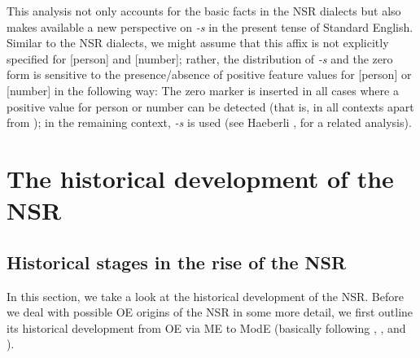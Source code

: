 \documentclass[output=paper]{langsci/langscibook}
\begin{document}
This analysis not only accounts for the basic facts in the
\gls{NSR} dialects but also makes available a new
perspective on \Tsg{} \emph{-s} in the present tense of Standard English.
Similar to the \gls{NSR} dialects, we might assume
that this affix is not explicitly specified for [person] and [number]; rather,
the distribution of \emph{-s} and the zero form is sensitive to the
presence/absence of positive feature values for [person] or [number] in the
following way: The zero marker is inserted in all cases where a positive value
for person or number can be detected (that is, in all contexts apart from
\Tsg{}); in the remaining context, \emph{-s} is used (see Haeberli
\citeyear{Haeberli:2002b}, \citealt{Roberts:2010} for a related analysis).

\section{The historical development of the NSR}
\label{sec:stages}

\subsection{Historical stages in the rise of the NSR}

In this section, we take a look at the historical development of the
\gls{NSR}.  Before we deal with possible \gls{OE}
origins of the \gls{NSR} in some more detail, we
first outline its historical development from \gls{OE} via \gls{ME} to ModE (basically following \citealt{Pietsch:2005a,Pietsch:2005b},
\citealt{deHaas:2011}, and \citealt{Cole2014}).
\end{document}
